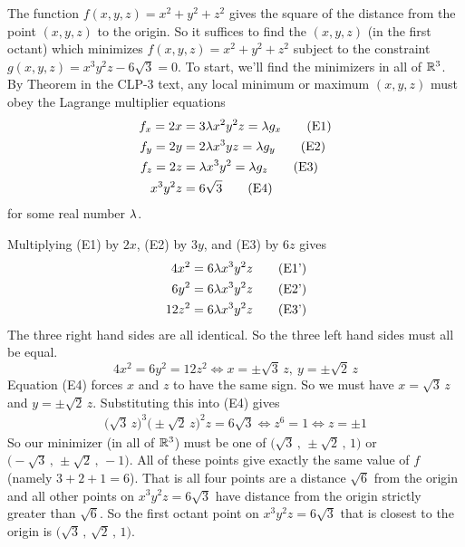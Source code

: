 \begin{solution}
The function $f(x,y,z)=x^2+y^2+z^2$ gives the square of the distance from 
the point $(x,y,z)$ to the origin. So it suffices to find the $(x,y,z)$
(in the first octant) which minimizes $f(x,y,z)=x^2+y^2+z^2$ subject 
to the constraint $g(x,y,z) = x^3y^2z -6\sqrt{3}=0$.
To start, we'll find the minimizers in all of $\mathbb{R}^3$.
By Theorem  in the CLP-3 text, any local minimum
or maximum $(x,y,z)$ must obey the  Lagrange multiplier equations
\begin{align*}
f_x = 2x &= 3 \lambda x^2y^2z = \lambda g_x \tag{E1} \\ 
f_y = 2y &=2 \lambda x^3 yz = \lambda g_y \tag{E2} \\ 
f_z = 2z &= \lambda x^3y^2 = \lambda g_z \tag{E3} \\ 
x^3y^2z &= 6\sqrt{3} \tag{E4}
\end{align*}
for some real number $\lambda$.

Multiplying (E1) by $2x$, (E2) by $3y$, and (E3) by $6z$ gives
\begin{align*}
4x^2 &= 6 \lambda x^3y^2z  \tag{E1'} \\ 
6y^2 &= 6 \lambda x^3y^2z  \tag{E2'} \\ 
12z^2&= 6 \lambda x^3y^2z  \tag{E3'} 
\end{align*}
The three right hand sides are all identical. So the three left hand sides
must all be equal.
\begin{equation*}
4x^2=6y^2=12z^2
\iff
x=\pm\sqrt{3}\, z,\ 
y=\pm\sqrt{2}\, z
\end{equation*}
Equation (E4) forces $x$ and $z$ to have the same sign.
So we must have $x=\sqrt{3}\,z$ and $y=\pm \sqrt{2}\,z$. 
Substituting this into (E4) gives
\begin{align*}
\big(\sqrt{3}\,z\big)^3 \big(\pm \sqrt{2}\,z\big)^2 z=6\sqrt{3}
\iff
z^6=1
\iff
z=\pm 1
\end{align*}
So our minimizer (in all of $\mathbb{R}^3$) must be one of
$\big(\sqrt{3}\,,\,\pm\sqrt{2}\,,\,1\big)$ or
$\big(-\sqrt{3}\,,\,\pm\sqrt{2}\,,\,-1\big)$. All of these
points give exactly the same value of $f$ (namely $3+2+1=6$).
That is all four points are a distance $\sqrt{6}$ from the origin
and all other points on $x^3y^2z=6\sqrt{3}$ have distance from the origin
strictly greater than $\sqrt{6}$.
So the first octant point on  $x^3y^2z=6\sqrt{3}$ that is closest
to the origin is $\big(\sqrt{3}\,,\,\sqrt{2}\,,\,1\big)$.
\end{solution}

